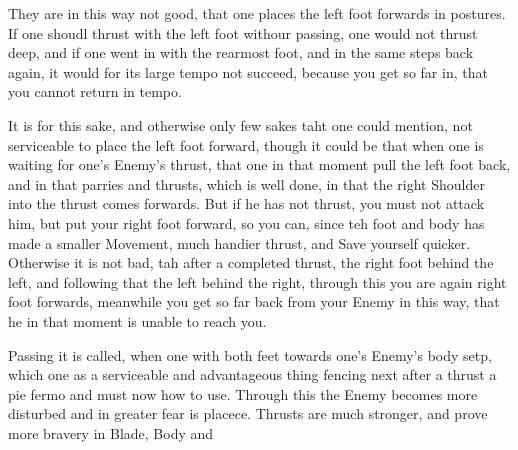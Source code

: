 They are in this way not good, that one places the left foot forwards
in postures. If one shoudl thrust with the left foot withour passing,
one would not thrust deep, and if one went in with the rearmost foot,
and in the same steps back again, it would for its large tempo not
succeed, because you get so far in, that you cannot return in tempo.


It is for this sake, and otherwise only few sakes taht one could
mention, not serviceable to place the left foot forward, though it
could be that when one is waiting for one's Enemy's thrust, that one
in that moment pull the left foot back, and in that parries and
thrusts, which is well done, in that the right Shoulder into the thrust
comes forwards. But if he has not thrust, you must not attack him, but
put your right foot forward, so you can, since teh foot and body has
made a smaller Movement, much handier thrust, and Save yourself
quicker. Otherwise it is not bad, tah after a completed thrust, the
right foot behind the left, and following that the left behind the
right, through this you are again right foot forwards, meanwhile you
get so far back from your Enemy in this way, that he in that moment is
unable to reach you.



Passing it is called, when one with both feet towards one's Enemy's
body setp, which one as a serviceable and advantageous thing fencing
next after a thrust a pie fermo and must now how to use. Through this
the Enemy becomes more disturbed and in greater fear is
placece. Thrusts are much stronger, and prove more
bravery in Blade, Body and
